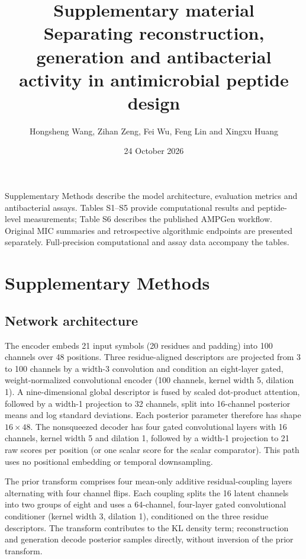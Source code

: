 \documentclass[11pt,a4paper]{article}
\title{Supplementary material\\[5pt]\large Separating reconstruction, generation and antibacterial activity in antimicrobial peptide design}
\author{Hongsheng Wang, Zihan Zeng, Fei Wu, Feng Lin and Xingxu Huang}
\date{24 October 2026}
\begin{document}
\maketitle\thispagestyle{fancy}
Supplementary Methods describe the model architecture, evaluation metrics and antibacterial assays. Tables S1--S5 provide computational results and peptide-level measurements; Table S6 describes the published AMPGen workflow. Original MIC summaries and retrospective algorithmic endpoints are presented separately. Full-precision computational and assay data accompany the tables.

\section*{Supplementary Methods}
\subsection*{Network architecture}
The encoder embeds 21 input symbols (20 residues and padding) into 100 channels over 48 positions. Three residue-aligned descriptors are projected from 3 to 100 channels by a width-3 convolution and condition an eight-layer gated, weight-normalized convolutional encoder (100 channels, kernel width 5, dilation 1). A nine-dimensional global descriptor is fused by scaled dot-product attention, followed by a width-1 projection to 32 channels, split into 16-channel posterior means and log standard deviations. Each posterior parameter therefore has shape $16\times48$. The nonsqueezed decoder has four gated convolutional layers with 16 channels, kernel width 5 and dilation 1, followed by a width-1 projection to 21 raw scores per position (or one scalar score for the scalar comparator). This path uses no positional embedding or temporal downsampling.

The prior transform comprises four mean-only additive residual-coupling layers alternating with four channel flips. Each coupling splits the 16 latent channels into two groups of eight and uses a 64-channel, four-layer gated convolutional conditioner (kernel width 3, dilation 1), conditioned on the three residue descriptors. The transform contributes to the KL density term; reconstruction and generation decode posterior samples directly, without inversion of the prior transform.
\end{document}
